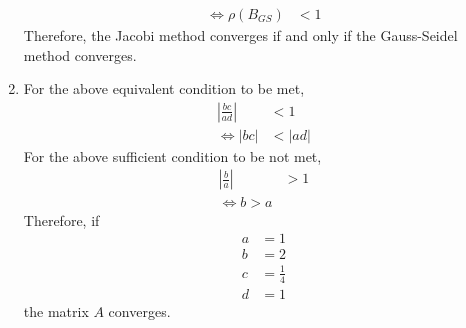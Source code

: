 \documentclass[fleqn, a4paper, 12pt, twoside]{article}
\theoremstyle{definition}
\theoremstyle{theorem}
\begin{document}
\begin{solution}
\begin{enumerate}[leftmargin=*]
\begin{align*}
				\iff \rho(B_{GS})                          & < 1
			\end{align*}
			Therefore, the Jacobi method converges if and only if the Gauss-Seidel method converges.
		\item
			For the above equivalent condition to be met,
			\begin{align*}
				\left| \frac{b c}{a d} \right| & < 1 \\
				\iff |b c|                     & < |a d|
			\end{align*}
			For the above sufficient condition to be not met,
			\begin{align*}
				\left| \frac{b}{a} \right| & > 1 \\
				\iff b > a
			\end{align*}
			Therefore, if
			\begin{align*}
				a & = 1           \\
				b & = 2           \\
				c & = \frac{1}{4} \\
				d & = 1
			\end{align*}
			the matrix $A$ converges.
	\end{enumerate}
\end{solution}
\end{document}

